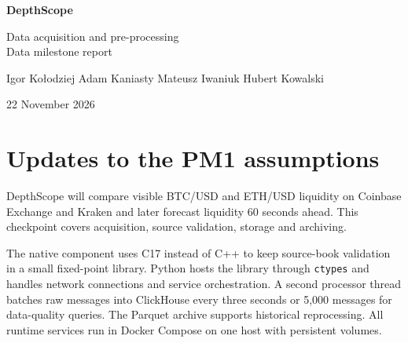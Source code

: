 \documentclass[11pt,a4paper]{article}
\begin{document}
\thispagestyle{plain}

\begin{center}
{\fontsize{23}{26}\selectfont\bfseries DepthScope}\par
\vspace{5pt}
{\fontsize{15}{18}\selectfont Data acquisition and pre-processing\\Data milestone report}\par
\vspace{6pt}
{\small Igor Kołodziej \quad Adam Kaniasty \quad Mateusz Iwaniuk \quad Hubert Kowalski}\par
\vspace{6pt}
{\small 22 November 2026\par}
\end{center}
\vspace{2pt}

\section{Updates to the PM1 assumptions}
DepthScope will compare visible BTC/USD and ETH/USD liquidity on Coinbase Exchange and Kraken and later forecast liquidity 60 seconds ahead. This checkpoint covers acquisition, source validation, storage and archiving.

The native component uses C17 instead of C++ to keep source-book validation in a small fixed-point library. Python hosts the library through \texttt{ctypes} and handles network connections and service orchestration. A second processor thread batches raw messages into ClickHouse every three seconds or 5,000 messages for data-quality queries. The Parquet archive supports historical reprocessing. All runtime services run in Docker Compose on one host with persistent volumes.
\end{document}
